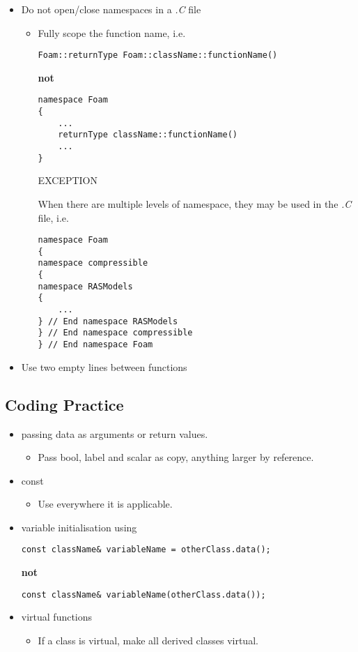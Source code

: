 \documentclass[11pt]{article}
\begin{document}
\begin{itemize}
\item Do not open/close namespaces in a \emph{.C} file
\begin{itemize}
\item Fully scope the function name, i.e.

\begin{verbatim}
Foam::returnType Foam::className::functionName()
\end{verbatim}
        \textbf{not}

\begin{verbatim}
namespace Foam
{
    ...
    returnType className::functionName()
    ...
}
\end{verbatim}
        EXCEPTION

        When there are multiple levels of namespace, they may be used in the
        \emph{.C} file, i.e.

\begin{verbatim}
namespace Foam
{
namespace compressible
{
namespace RASModels
{
    ...
} // End namespace RASModels
} // End namespace compressible
} // End namespace Foam
\end{verbatim}
\end{itemize}
\item Use two empty lines between functions
\end{itemize}
\subsection{Coding Practice}
\label{sec-1-4}

\begin{itemize}
\item passing data as arguments or return values.
\begin{itemize}
\item Pass bool, label and scalar as copy, anything larger by reference.
\end{itemize}
\item const
\begin{itemize}
\item Use everywhere it is applicable.
\end{itemize}
\item variable initialisation using

\begin{verbatim}
const className& variableName = otherClass.data();
\end{verbatim}
      \textbf{not}

\begin{verbatim}
const className& variableName(otherClass.data());
\end{verbatim}
\item virtual functions
\begin{itemize}
\item If a class is virtual, make all derived classes virtual.
\end{itemize}
\end{itemize}
\end{document}
